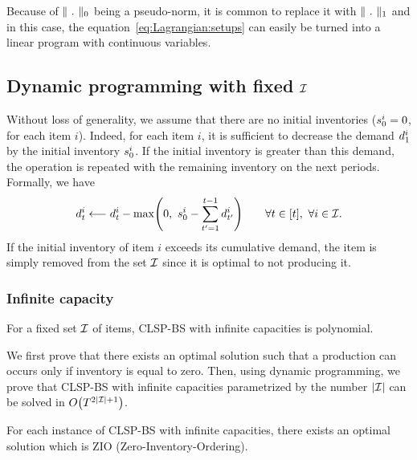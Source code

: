Because of $\norm{\ .\ }_0$ being a pseudo-norm, it is common to replace it with $\norm{\ .\ }_1$ and in this case, the equation~\eqref{eq:Lagrangian:setups} can easily be turned into a linear program with continuous variables.



\subsection{Dynamic programming with fixed $\mathcal{I}$}

Without loss of generality, we assume that there are no initial inventories (\ie $s_0^i=0$, for each item $i$).
Indeed, for each item $i$, it is sufficient to decrease the demand $d_1^i$ by the initial inventory $s_0^i$.
If the initial inventory is greater than this demand, the operation is repeated with the remaining inventory on the next periods.
Formally, we have
\begin{equation}
  \demand_t^i\longleftarrow\demand_t^i-\max\bracket{0,\ \inventory_0^i-\sum_{t'=1}^{t-1}\demand_{t'}^i}\qquad\forall t\in\range{t},\ \forall i\in\REF.
\end{equation}
If the initial inventory of item $i$ exceeds its cumulative demand, the item is simply removed from the set $\mathcal{I}$ since it is optimal to not producing it.




\subsubsection{Infinite capacity}


\begin{thm}\label{thm:complexity:fixed-number-items:infinite-capacity}
For a fixed set $\mathcal{I}$ of items, CLSP-BS with infinite capacities is polynomial.
\end{thm}


We first prove that there exists an optimal solution such that a production can occurs only if inventory is equal to zero.
Then, using dynamic programming, we prove that CLSP-BS with infinite capacities parametrized by the number $\card{\REF}$ can be solved in $O\bracket{\horizon^{2\card{\REF}+1}}$.




\begin{lem}\label{lem:complexity:fixed-number-items:infinite-capacity:ZIO}
For each instance of CLSP-BS with infinite capacities, there exists an optimal solution which is ZIO (Zero-Inventory-Ordering).
\end{lem}



